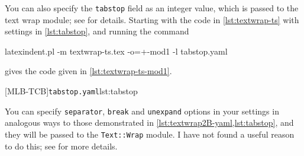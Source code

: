 	You can also specify the \texttt{tabstop} field  as an integer value, which is passed to the text wrap module; see
	\cite{textwrap} for details. Starting with the code in \cref{lst:textwrap-ts} with
	settings in \cref{lst:tabstop}, and running the command 
	\begin{commandshell}
	 latexindent.pl -m textwrap-ts.tex -o=+-mod1 -l tabstop.yaml
	 \end{commandshell}
	gives the code given in \cref{lst:textwrap-ts-mod1}.
	\begin{cmhtcbraster}[raster columns=3,
			raster left skip=-3.5cm,
			raster right skip=-2cm,
			raster column skip=.03\linewidth]
		[MLB-TCB]{\texttt{tabstop.yaml}}{lst:tabstop}
	\end{cmhtcbraster}

	You can specify \texttt{separator}, \texttt{break} and \texttt{unexpand} options in your
	settings in analogous ways to those demonstrated in
	\cref{lst:textwrap2B-yaml,lst:tabstop}, and they will be passed to the
	\texttt{Text::Wrap} module. I have not found a useful reason to do this; see
	\cite{textwrap} for more details.
